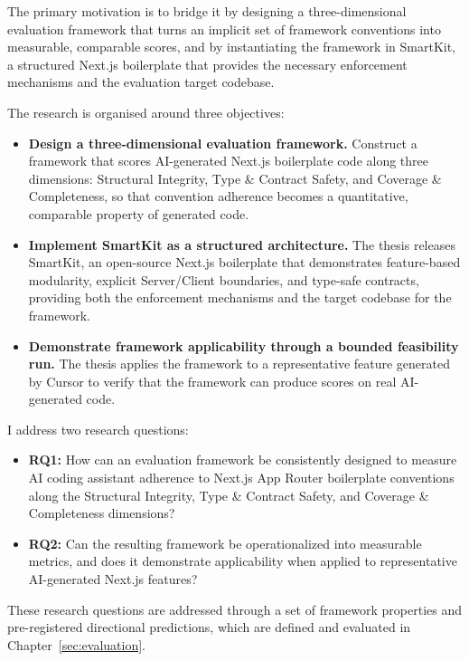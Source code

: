 \documentclass[12pt,a4paper]{report}
\begin{document}
The primary motivation is to bridge it by designing a three-dimensional evaluation framework that turns an implicit set of framework conventions into measurable, comparable scores, and by instantiating the framework in SmartKit, a structured Next.js boilerplate that provides the necessary enforcement mechanisms and the evaluation target codebase.

The research is organised around three objectives:
{\sloppy
\begin{itemize}
    \item \textbf{Design a three-dimensional evaluation framework.}
    Construct a framework that scores AI-generated Next.js boilerplate
    code along three dimensions: Structural Integrity, Type \& Contract Safety, and
    Coverage \& Completeness, so that convention adherence becomes a quantitative,
    comparable property of generated code.
    \item \textbf{Implement SmartKit as a structured architecture.}
    The thesis releases SmartKit, an open-source Next.js boilerplate
    that demonstrates feature-based modularity, explicit Server/Client
    boundaries, and type-safe contracts, providing both the enforcement
    mechanisms and the target codebase for the framework.
    \item \textbf{Demonstrate framework applicability through a bounded
    feasibility run.} The thesis applies the framework to a representative
    feature generated by Cursor to verify that
    the framework can produce scores on real AI-generated code.
\end{itemize}
}

I address two research questions:
\begin{itemize}
    \item \textbf{RQ1:}\label{RQ1} How can an evaluation framework be consistently designed to
    measure AI coding assistant adherence to Next.js App Router boilerplate conventions along the Structural Integrity, Type \& Contract Safety, and
    Coverage \& Completeness dimensions?
    \item \textbf{RQ2:}\label{RQ2} Can the resulting framework be operationalized into measurable
    metrics, and does it demonstrate applicability when applied to
    representative AI-generated Next.js features?
\end{itemize}

These research questions are addressed through a set of framework
properties and pre-registered directional predictions, which are
defined and evaluated in Chapter~\ref{sec:evaluation}.
\end{document}
